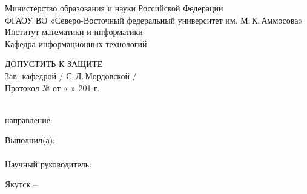 \makeatletter
\begin{titlepage}
  \begin{center}
      Министерство образования и науки Российской Федерации\\
      ФГАОУ ВО «Северо-Восточный федеральный университет им. М.\,К.\,Аммосова»\\
      Институт математики и информатики\\
      Кафедра информационных технологий
  \end{center}

  \vspace{15mm}

  \begin{flushright}
      \begin{minipage}{0.5\textwidth}
          \begin{center}
              {\large ДОПУСТИТЬ К ЗАЩИТЕ}\\
              Зав. кафедрой \underline{\hspace{15mm}} / С.\,Д.\,Мордовской /\\
              Протокол № \underline{\hspace{5mm}} от « \underline{\hspace{3mm}} » \underline{\hspace{20mm}} 201\underline{\hspace{3mm}} г.
          \end{center}
      \end{minipage}
  \end{flushright}

  \vspace{15mm}

  \begin{center}
      \LARGE{\@title}
  \end{center}

  \vspace{5mm}

  \begin{center}
      \@thesis\\
      направление: \@specialty
  \end{center}

  \vfill

  \begin{flushright}
      \begin{minipage}{0.5\textwidth}
          Выполнил(а): \@student\\
          \@author\\
          Научный руководитель: \@position\\
          \@teacher
      \end{minipage}
  \end{flushright}

  \vspace{25mm}

  \begin{center}
      Якутск – \the\year
  \end{center}
\end{titlepage}
\makeatother